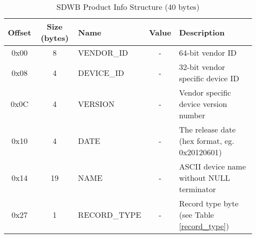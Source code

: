 \documentclass[a4paper, 12pt]{article}
\begin{document}
\begin{center}
  \begin{savenotes}
    \begin{table}[!ht]\footnotesize
      \caption{SDWB Product Info Structure (40 bytes)}\label{sdwb_product_struct}\centering
        \begin{tabular}{| c | c | l | c | p{5cm} |} \hline
        Offset & Size (bytes) & Name & Value & Description \\ \hline
        0x00 & 8 & VENDOR\_ID & - & 64-bit vendor ID \\ \hline
        0x08 & 4 & DEVICE\_ID & - & 32-bit vendor specific device ID \\ \hline
        0x0C & 4 & VERSION & - & Vendor specific device version number \\ \hline
        0x10 & 4 & DATE & - & The release date (hex format, eg. 0x20120601) \\ \hline
        0x14 & 19 & NAME & - & ASCII device name without NULL terminator \\ \hline
        0x27 & 1 & RECORD\_TYPE & - & Record type byte (see Table \ref{record_type}) \\ \hline
        \end{tabular}
    \end{table}
  \end{savenotes}
\end{center}
\end{document}
